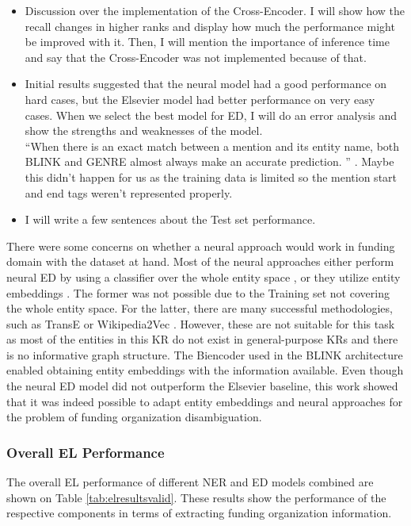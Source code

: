 \documentclass{report}
\theoremstyle{definition}
\theoremstyle{remark}
\begin{document}
\begin{itemize}
    \item Discussion over the implementation of the Cross-Encoder. I will show how the recall changes in higher ranks and display how much the performance might be improved with it. Then, I will mention the importance of inference time and say that the Cross-Encoder was not implemented because of that.
    \item Initial results suggested that the neural model had a good performance on hard cases, but the Elsevier model had better performance on very easy cases. When we select the best model for ED, I will do an error analysis and show the strengths and weaknesses of the model. \\
    ``When there is an exact match between a mention
and its entity name, both BLINK and GENRE almost always make an accurate prediction. '' \cite{GENRE}. Maybe this didn't happen for us as the training data is limited so the mention start and end tags weren't represented properly.
    \item I will write a few sentences about the Test set performance.
\end{itemize}

There were some concerns on whether a neural approach would work in funding domain with the dataset at hand. Most of the neural approaches either perform neural ED by using a classifier over the whole entity space \textcolor{red}{\cite{}}, or they utilize entity embeddings \textcolor{red}{\cite{}}. The former was not possible due to the Training set not covering the whole entity space. For the latter, there are many successful methodologies, such as TransE \cite{TransE} or Wikipedia2Vec \cite{wikipedia2vec2}. However, these are not suitable for this task as most of the entities in this KR do not exist in general-purpose KRs and there is no informative graph structure. The Biencoder used in the BLINK architecture enabled obtaining entity embeddings with the information available. Even though the neural ED model did not outperform the Elsevier baseline, this work showed that it was indeed possible to adapt entity embeddings and neural approaches for the problem of funding organization disambiguation.

\subsubsection{Overall EL Performance}
The overall EL performance of different NER and ED models combined are shown on Table \ref{tab:elresultsvalid}. These results show the performance of the respective components in terms of extracting funding organization information.
\end{document}
